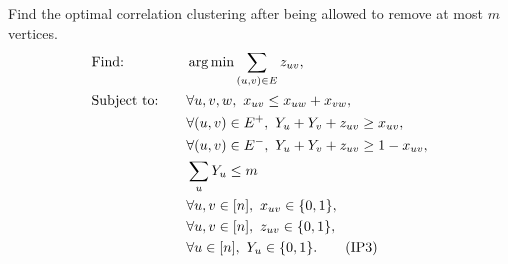 Find the optimal correlation clustering after being allowed to remove at most $m$ vertices.
\begin{alignat}{3} \label{IP:CC4}
		&\text{Find: } && \operatorname*{arg\,min} \sum_{(u,v) \in E} z_{uv}, \nonumber\\
		&\text{Subject to:} \quad && \forall u,v,w,\ x_{uv} \le x_{uw} + x_{vw}, \nonumber\\
		& && \forall (u,v) \in E^+,\ Y_u + Y_v + z_{uv} \ge x_{uv}, \nonumber\\
		& && \forall (u,v) \in E^-,\ Y_u + Y_v + z_{uv} \ge 1 - x_{uv}, \nonumber\\
		& && \sum_{u} Y_u \le m \nonumber \\
		& && \forall u,v \in [n],\ x_{uv} \in \{ 0,1 \},\nonumber\\
		& && \forall u,v \in [n],\ z_{uv} \in \{ 0,1 \},\nonumber\\
		& && \forall u \in [n],\ Y_u \in \{ 0,1 \}. \tag{IP3}
\end{alignat}

